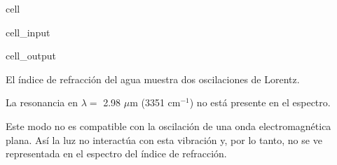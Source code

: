 \documentclass[letterpaper,10pt,english]{jupyterBook}
\let\sphinxpxdimen\pdfpxdimen\else\newdimen\sphinxpxdimen
\begin{document}
\begin{sphinxuseclass}{cell}\begin{sphinxVerbatimInput}

\begin{sphinxuseclass}{cell_input}
\begin{sphinxVerbatim}[commandchars=\\\{\}]
   
    
\end{sphinxVerbatim}

\end{sphinxuseclass}\end{sphinxVerbatimInput}
\begin{sphinxVerbatimOutput}

\begin{sphinxuseclass}{cell_output}
\noindent{}

\end{sphinxuseclass}\end{sphinxVerbatimOutput}

\end{sphinxuseclass}
\sphinxAtStartPar
El índice de refracción del agua muestra dos oscilaciones de Lorentz.

\noindent{\hspace*{\fill}\sphinxincludegraphics[width=800\sphinxpxdimen]{{h2o_nk}.svg}\hspace*{\fill}}

\sphinxAtStartPar
La resonancia en \(\lambda =\) 2.98 \(\mu\)m (3351 cm\(^{-1}\)) no está presente en el espectro.

\sphinxAtStartPar
Este modo no es compatible con la oscilación de una onda electromagnética plana. Así la luz no interactúa con esta vibración y, por lo tanto, no se ve representada en el espectro del índice de refracción.
\end{document}
